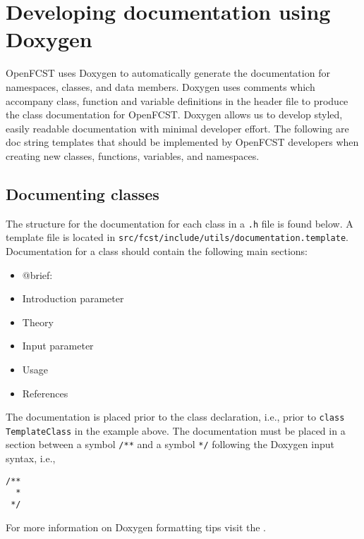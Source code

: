 \section{Developing documentation using Doxygen}

OpenFCST uses Doxygen to automatically generate the documentation for namespaces, classes, and data members. Doxygen uses comments which accompany class, function and variable definitions in the header file to produce the class documentation for OpenFCST. Doxygen allows us to develop styled, easily readable documentation with minimal developer effort. The following are doc string templates that should be implemented by OpenFCST developers when creating new classes, functions, variables, and namespaces.

\subsection{Documenting classes}

The structure for the documentation for each class in a \texttt{.h} file is found below. A template file is located in \texttt{src/fcst/include/utils/documentation.template}. Documentation for a class should contain the following main sections:
\begin{itemize}
 \item @brief: 
 \item Introduction parameter
 \item Theory
 \item Input parameter
 \item Usage
 \item References
\end{itemize}

The documentation is placed prior to the class declaration, i.e., prior to \texttt{class TemplateClass} in the example above. The documentation must be placed in a section between a symbol \texttt{/**} and a symbol \texttt{*/} following the Doxygen input syntax, i.e., 
\begin{lstlisting}
/**
  *
 */
\end{lstlisting}
For more information on Doxygen formatting tips visit the . 

